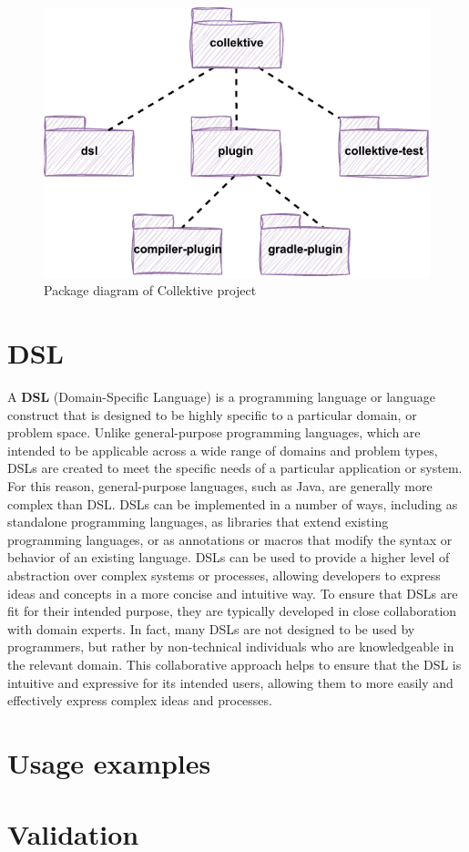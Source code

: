 \begin{figure}[!ht]
    \centering
    \includegraphics[scale=1.1]{document/chapters/4-collektive/images/collektive_package_diagram.pdf}
    \caption{Package diagram of Collektive project}
    \label{fig:collektive_package_diagram}
\end{figure}

\section{DSL}\label{section:dsl}
A \textbf{DSL} (Domain-Specific Language) \cite{dsl_definition} is a programming language or language construct that is designed to be highly specific to a particular domain, or problem space. Unlike general-purpose programming languages, which are intended to be applicable across a wide range of domains and problem types, DSLs are created to meet the specific needs of a particular application or system. For this reason, general-purpose languages, such as Java, are generally more complex than DSL.\newline 
DSLs can be implemented in a number of ways, including as standalone programming languages, as libraries that extend existing programming languages, or as annotations or macros that modify the syntax or behavior of an existing language. DSLs can be used to provide a higher level of abstraction over complex systems or processes, allowing developers to express ideas and concepts in a more concise and intuitive way.\newline
To ensure that DSLs are fit for their intended purpose, they are typically developed in close collaboration with domain experts. In fact, many DSLs are not designed to be used by programmers, but rather by non-technical individuals who are knowledgeable in the relevant domain. This collaborative approach helps to ensure that the DSL is intuitive and expressive for its intended users, allowing them to more easily and effectively express complex ideas and processes.

\section{Usage examples}\label{section:usage_example}

\section{Validation}\label{section:validation}
